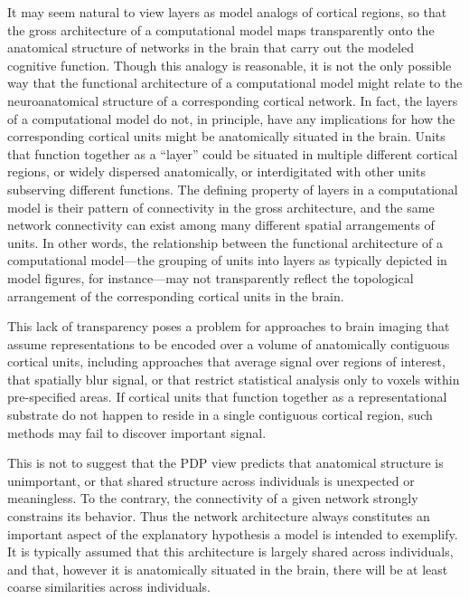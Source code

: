 It may seem natural to view layers as model analogs of cortical regions, so that the gross architecture of a computational model maps transparently onto the anatomical structure of networks in the brain that carry out the modeled cognitive function. Though this analogy is reasonable, it is not the only possible way that the functional architecture of a computational model might relate to the neuroanatomical structure of a corresponding cortical network. In fact, the layers of a computational model do not, in principle, have any implications for how the corresponding cortical units might be anatomically situated in the brain. Units that function together as a ``layer'' could be situated in multiple different cortical regions, or widely dispersed anatomically, or interdigitated with other units subserving different functions. The defining property of layers in a computational model is their pattern of connectivity in the gross architecture, and the same network connectivity can exist among many different spatial arrangements of units. In other words, the relationship between the functional architecture of a computational model---the grouping of units into layers as typically depicted in model figures, for instance---may not transparently reflect the topological arrangement of the corresponding cortical units in the brain. 

This lack of transparency poses a problem for approaches to brain imaging that assume representations to be encoded over a volume of anatomically contiguous cortical units, including approaches that average signal over regions of interest, that spatially blur signal, or that restrict statistical analysis only to voxels within pre-specified areas. If cortical units that function together as a representational substrate do not happen to reside in a single contiguous cortical region, such methods may fail to discover important signal.

This is not to suggest that the PDP view predicts that anatomical structure is unimportant, or that shared structure across individuals is unexpected or meaningless. To the contrary, the connectivity of a given network strongly constrains its behavior. Thus the network architecture always constitutes an important aspect of the explanatory hypothesis a model is intended to exemplify. It is typically assumed that this architecture is largely shared across individuals, and that, however it is anatomically situated in the brain, there will be at least coarse similarities across individuals. 

